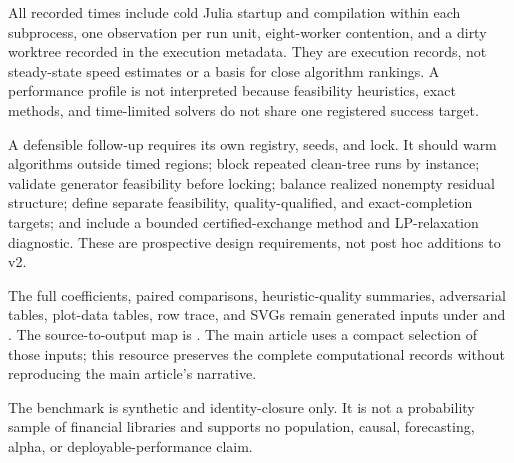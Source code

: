 All recorded times include cold Julia startup and compilation within each
subprocess, one observation per run unit, eight-worker contention, and a dirty
worktree recorded in the execution metadata. They are execution records, not
steady-state speed estimates or a basis for close algorithm rankings. A
performance profile is not interpreted because feasibility heuristics, exact
methods, and time-limited solvers do not share one registered success target.

A defensible follow-up requires its own registry, seeds, and lock. It should
warm algorithms outside timed regions; block repeated clean-tree runs by
instance; validate generator feasibility before locking; balance realized
nonempty residual structure; define separate feasibility, quality-qualified,
and exact-completion targets; and include a bounded certified-exchange method
and LP-relaxation diagnostic. These are prospective design requirements, not
post hoc additions to v2.

The full coefficients, paired comparisons, heuristic-quality summaries,
adversarial tables, plot-data tables, row trace, and SVGs remain generated
inputs under  and . The
source-to-output map is
. The main article uses
a compact selection of those inputs; this resource preserves the complete
computational records without reproducing the main article's narrative.

The benchmark is synthetic and identity-closure only. It is not a probability
sample of financial libraries and supports no population, causal, forecasting,
alpha, or deployable-performance claim.
